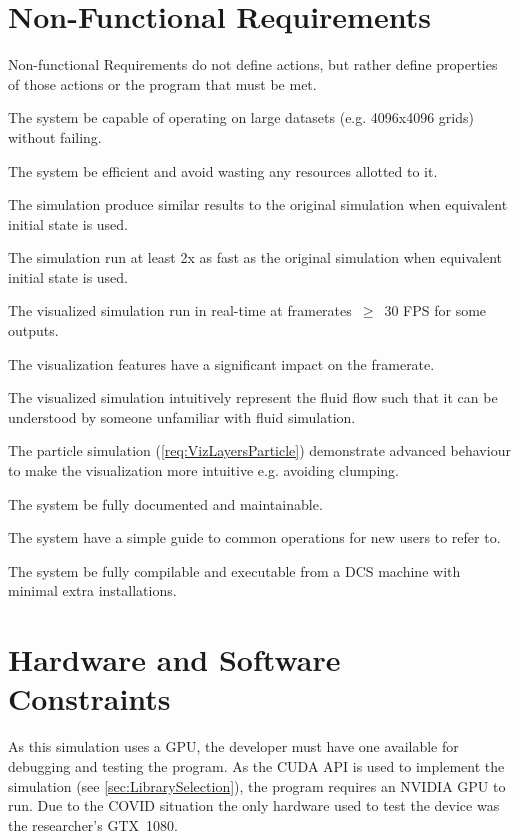 \section{Non-Functional Requirements}
Non-functional Requirements do not define actions, but rather define properties of those actions or the program that must be met.
\begin{reqNF}
    \item \label{reqN:LargeData} The system \must{} be capable of operating on large datasets (e.g. 4096x4096 grids) without failing.
    \item \label{reqN:Resources} The system \must{} be efficient and avoid wasting any resources allotted to it.
    \item \label{reqN:SimilarOutput} The simulation \must{} produce similar results to the original simulation when equivalent initial state is used.
    \item \label{reqN:SimSpeed} The simulation \should{} run at least 2x as fast as the original simulation when equivalent initial state is used.
    \item \label{reqN:Realtime} The visualized simulation \must{} run in real-time at framerates~$\ge$~30 FPS for some outputs.
    \item \label{reqN:VizSpeed} The visualization features \shouldnt{} have a significant impact on the framerate.
    \item \label{reqN:Intuitive} The visualized simulation \should{} intuitively represent the fluid flow such that it can be understood by someone unfamiliar with fluid simulation.
    \item \label{reqN:VizParticleAdvanced} The particle simulation (\cref{req:VizLayersParticle}) \should{} demonstrate advanced behaviour to make the visualization more intuitive e.g. avoiding clumping.
    \item \label{reqN:Documented} The system \must{} be fully documented and maintainable. %
    \item \label{reqN:UsageGuide} The system \should{} have a simple guide to common operations for new users to refer to.
    \item \label{reqN:DCSCompile} The system \should{} be fully compilable and executable from a DCS machine with minimal extra installations.
\end{reqNF}

\section{Hardware and Software Constraints}
\label{sec:Requirements_HardwareSoftware}
As this simulation uses a GPU, the developer must have one available for debugging and testing the program.
As the CUDA API is used to implement the simulation (see \cref{sec:LibrarySelection}), the program requires an NVIDIA GPU to run.
Due to the COVID situation the only hardware used to test the device was the researcher's GTX~1080.

